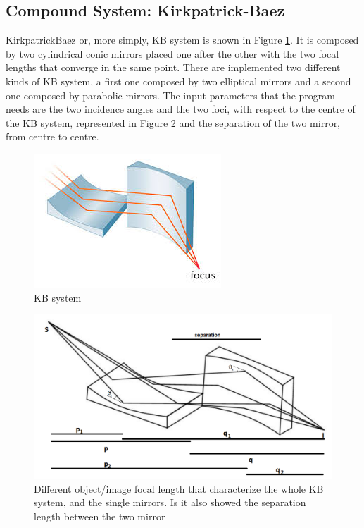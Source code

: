 \subsection{Compound System: Kirkpatrick-Baez}
KirkpatrickBaez or, more simply, KB system is shown in Figure \ref{fig: KB}. It is composed by two cylindrical conic mirrors placed one after the other with the two focal lengths that converge in the same point. There are implemented two different kinds of KB system, a first one composed by two elliptical mirrors and a second one composed by parabolic mirrors. The input parameters that the program needs are the two incidence angles and the two foci, with respect to the centre of the KB system, represented in Figure \ref{fig: KB1} and the separation of the two mirror, from centre to centre.
\begin{figure}[H]
%
\centering
%
\includegraphics[width=.4\textwidth]{Immagini/Chapter3/KB}
%
\caption{KB system}
%
\label{fig: KB}
%
\end{figure}
\begin{figure}[H]
%
%
\includegraphics[width=.8\textwidth]{Immagini/Chapter3/KB1}
%
\caption{Different object/image focal length that characterize the whole KB system, and the single mirrors. Is it also showed the separation length between the two mirror}
%
\label{fig: KB1}
%
\end{figure}
%
%
%
